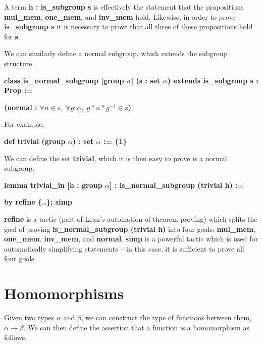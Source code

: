 \documentclass[runningheads,a4paper]{llncs}
\renewcommand{\a}{\alpha}
\renewcommand{\b}{\beta}
\renewcommand{\-}{\setminus}
\begin{document}
A term \textbf{h : is\_subgroup s} is effectively the statement that the propositions \textbf{mul\_mem}, \textbf{one\_mem}, and \textbf{inv\_mem} hold. Likewise, in order to prove \textbf{is\_subgroup s} it is necessary to prove that all three of these propositions hold for \textbf{s}.

We can similarly define a normal subgroup, which extends the subgroup structure.

\vspace{2 mm}
\hspace{2 em}\textbf{class is\_normal\_subgroup [group $\a$] (s : set $\a$) extends is\_subgroup s : Prop :=}

\hspace{4 em}\textbf{(normal : $\forall n \in s,\; \forall g : \a,\; g * n * g^{-1} \in s$)}
\vspace{2 mm}

For example, 

\vspace{2 mm}
\hspace{2 em}\textbf{def trivial (group $\a$) : set $\a$ := \{1\}}
\vspace{2 mm}

We can define the set \textbf{trivial}, which it is then easy to prove is a normal subgroup.

\vspace{2 mm}
\hspace{2 em}\textbf{lemma trivial\_in [h : group $\a$] : is\_normal\_subgroup (trivial h) :=}

\hspace{4 em}\textbf{by refine \{..\}; simp}
\vspace{2 mm}

\textbf{refine} is a tactic (part of Lean's automation of theorem proving) which splits the goal of proving \textbf{is\_normal\_subgroup (trivial h)} into four goals: \textbf{mul\_mem}, \textbf{one\_mem}, \textbf{inv\_mem}, and \textbf{normal}. \textbf{simp} is a powerful tactic which is used for automatically simplifying statements -- in this case, it is sufficient to prove all four goals.

\section{Homomorphisms}

Given two types $\a$ and $\b$, we can construct the type of functions between them, $\a \to \b$. We can then define the assertion that a function is a homomorphism as follows.
\end{document}
